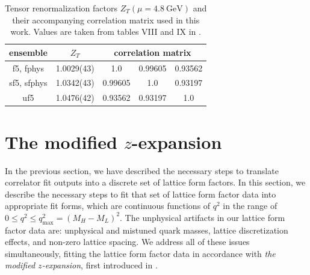 \begin{table}[]
    \centering
    \caption{Tensor renormalization factors $Z_T(\mu = 4.8 \ \mathrm{GeV})$ and their accompanying correlation matrix used in this work.  Values are taken from tables VIII and IX in \cite{Hatton_2020}.}
    \begin{tabular}{c c c c c}
        \hline
        ensemble & $Z_T$ & \multicolumn{3}{c}{correlation matrix} \\
        \hline
        f5, fphys   & 1.0029(43)&  1.0        & 0.99605 &  0.93562\\
        sf5, sfphys & 1.0342(43)&  0.99605    & 1.0     &  0.93197\\
        uf5         & 1.0476(42)&  0.93562    & 0.93197 &  1.0\\
             \hline
    \end{tabular}
    \label{tab:Z_T}
\end{table}



\section{The modified $z$-expansion}\label{sec:modified-z-expansion}
In the previous section, we have described the necessary steps to translate correlator fit outputs into a discrete set of lattice form factors.  In this section, we describe the necessary steps to fit that set of lattice form factor data into appropriate fit forms, which are continuous functions of $q^2$ in the range of $0\leq q^2 \leq q^2_\mathrm{max} = (M_H - M_L)^2$.  The unphysical artifacts in our lattice form factor data are: unphysical and mistuned quark masses, lattice discretization effects, and non-zero lattice spacing.  We address all of these issues simultaneously, fitting the lattice form factor data in accordance with \textit{the modified $z$-expansion}, first introduced in \cite{Na_2010}.

